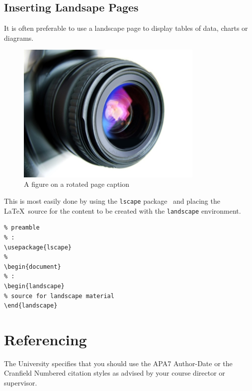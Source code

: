 \documentclass[12pt,oneside]{book} %
\begin{document}
\begin{landscape}
\section{Inserting Landsape Pages}
It is often preferable to use a landscape page to display tables of data, charts or diagrams.  
\begin{figure}[ht]
\begin{center}
\includegraphics[width=0.8\textwidth]{FigureExample}
\end{center}
\caption{A figure on a rotated page caption}
\label{fig:FigureExampleRotated}
\end{figure} 
This is most easily done by using the \verb#lscape# package~\cite{carlisle_ctan_2020} and placing the \LaTeX\ source for the content to be created with the \verb#landscape# environment. 
\begin{verbatim}
% preamble
% : 
\usepackage{lscape}
% 
\begin{document}
% :
\begin{landscape}
% source for landscape material
\end{landscape}
\end{verbatim}
 
\end{landscape}



\chapter{Referencing}
\label{chap:referencing}
The University specifies that you should use the APA7 Author-Date \cite{cranfield_library_service_apa7_2021} or the Cranfield Numbered \cite{barrington_library_numbered_2016} citation styles as advised by your course director or supervisor. 
\end{document}
